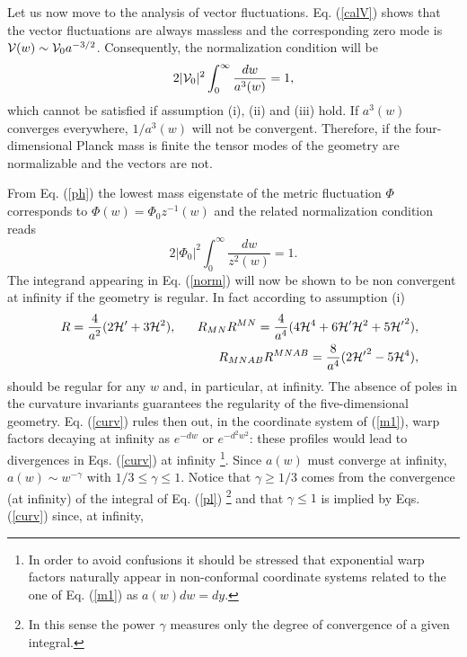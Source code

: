 \documentclass[a4paper,12pt]{article}
\begin{document}
Let us now move to the analysis of vector fluctuations.
 Eq. (\ref{calV}) shows that the vector fluctuations are 
always massless and the corresponding zero mode is ${\cal V}(w) \sim 
{\cal V}_0 a^{-3/2} $. Consequently, the normalization 
condition will be 
\begin{equation}
2 |{\cal V}_0|^2 \int_{0}^{\infty} \frac{d w}{a^3(w)} =1,
\end{equation}
which cannot be satisfied if assumption (i), (ii) and (iii) hold. If $a^3(w)$ 
converges everywhere, $1/a^3(w)$ will not be convergent.
Therefore, if the four-dimensional Planck mass 
is finite the tensor modes of the geometry are normalizable and the vectors 
are not.

From Eq. (\ref{ph}) the lowest mass eigenstate 
of the metric fluctuation $\Phi$ corresponds to 
$\Phi(w)= \Phi_0 z^{-1}(w)$ and the 
related normalization condition reads 
\begin{equation} 
2|\Phi_0|^2 \int_{0}^{\infty} \frac{dw}{z^2(w)}=1.
\label{norm}
\end{equation}
The integrand appearing in Eq. (\ref{norm}) will now be shown 
to be non convergent at infinity if the geometry is regular. In fact 
 according to assumption (i)
\begin{eqnarray}
&& R = \frac{4}{a^2} ( 2 {\cal H}' + 3 {\cal H}^2),
~~~~~R_{M N}R^{M N} = \frac{4}{a^4}( 4 {\cal H}^4 + 6 {\cal H}' {\cal H}^2
+ 5 {{\cal H}'}^2),
\nonumber\\
&& R_{M N A B}R^{M N A B} = \frac{8}{a^4}( 
2 {{\cal H}'}^2 - 5 {\cal H}^4),
\label{curv}
\end{eqnarray}
should be regular for any $w$ and, in particular, at infinity. The absence 
of poles in the curvature invariants guarantees the regularity of the 
five-dimensional geometry. 
Eq. (\ref{curv}) rules then out, in the coordinate system of (\ref{m1}), 
warp factors decaying at infinity as $e^{-d w}$ or $e^{- d^2 w^2}$: these
profiles would lead to divergences in Eqs. (\ref{curv}) at infinity 
\footnote{In order to avoid confusions it should be stressed that 
exponential warp factors naturally appear in non-conformal coordinate systems
related to the one of Eq. (\ref{m1}) as $a(w) dw = dy$.}.
Since $a(w)$ must converge at infinity,  $a(w) \sim w^{-\gamma}$
with $1/3\leq\gamma \leq 1$. Notice that $\gamma\geq 1/3$ 
comes  from the
 convergence (at infinity) of the integral of Eq. (\ref{pl}) \footnote{ 
In this sense the power $\gamma$ measures only the degree of convergence 
of a given integral.} and that $\gamma \leq 1$ is implied 
by Eqs. (\ref{curv}) since, at infinity, 
\end{document}
